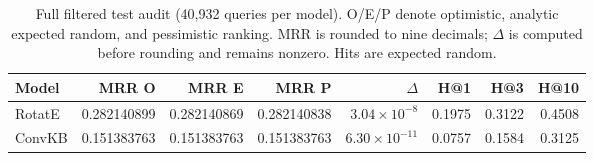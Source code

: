 \begin{table}[t]
\centering
\small
\setlength{\tabcolsep}{3pt}
\caption{Full filtered test audit (40,932 queries per model). O/E/P denote optimistic, analytic expected random, and pessimistic ranking. MRR is rounded to nine decimals; $\Delta$ is computed before rounding and remains nonzero. Hits are expected random.}
\label{tab:gosha-main}
\begin{tabular*}{\textwidth}{@{\extracolsep{\fill}}lrrrrrrr@{}}
\toprule
Model & MRR O & MRR E & MRR P & $\Delta$ & H@1 & H@3 & H@10 \\
\midrule
RotatE & 0.282140899 & 0.282140869 & 0.282140838 & $3.04\times10^{-8}$ & 0.1975 & 0.3122 & 0.4508 \\
ConvKB & 0.151383763 & 0.151383763 & 0.151383763 & $6.30\times10^{-11}$ & 0.0757 & 0.1584 & 0.3125 \\
\bottomrule
\end{tabular*}
\end{table}
